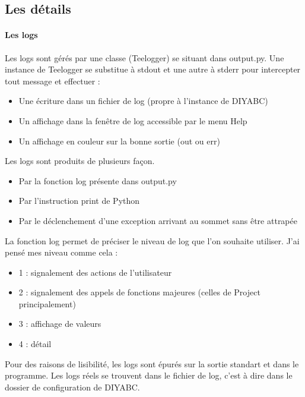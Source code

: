 \documentclass[12pt,a4paper]{article}
\begin{document}
    \subsection{Les détails}
        \paragraph{Les logs}
        Les logs sont gérés par une classe (Teelogger) se situant dans output.py. Une instance de Teelogger
        se substitue à stdout et une autre à stderr pour intercepter tout message et effectuer : 
        \begin{itemize}
            \item Une écriture dans un fichier de log (propre à l'instance de DIYABC)
            \item Un affichage dans la fenêtre de log accessible par le menu Help
            \item Un affichage en couleur sur la bonne sortie (out ou err) \\
        \end{itemize}

        Les logs sont produits de plusieurs façon. 
        \begin{itemize}
            \item Par la fonction log présente dans output.py
            \item Par l'instruction print de Python
            \item Par le déclenchement d'une exception arrivant au sommet sans être attrapée\\
        \end{itemize}
        
        La fonction log permet de préciser le niveau de log que l'on souhaite utiliser. J'ai pensé mes niveau comme cela :
        \begin{itemize}
            \item 1 : signalement des actions de l'utilisateur
            \item 2 : signalement des appels de fonctions majeures (celles de Project principalement)
            \item 3 : affichage de valeurs
            \item 4 : détail
        \end{itemize}

        Pour des raisons de lisibilité, les logs sont épurés sur la sortie standart et dans le programme. Les logs réels
        se trouvent dans le fichier de log, c'est à dire dans le dossier de configuration de DIYABC.
\end{document}
